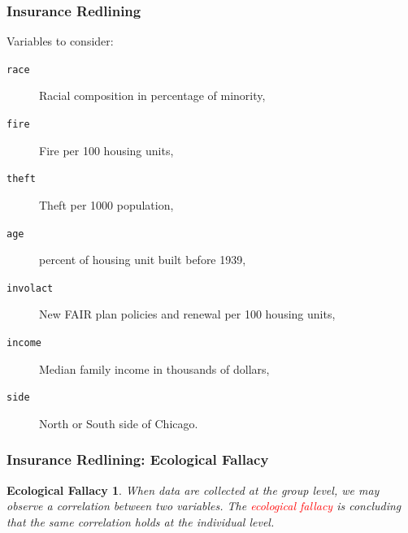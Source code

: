 \newtheorem{DEFsponsorUSCCR}{Sponsor}
\newtheorem{DEFdataFAIR}{Data}

\begin{frame}
    \frametitle{ Insurance Redlining}
    Variables to consider:
    \begin{description}
        \item[\texttt{race}] Racial composition in percentage of minority,
        \item[\texttt{fire}] Fire per 100 housing units,
        \item[\texttt{theft}] Theft per 1000 population,
        \item[\texttt{age}] percent of housing unit built before 1939,
        \item[\texttt{involact}] New FAIR plan policies and renewal per 100 housing units,
        \item[\texttt{income}] Median family income in thousands of dollars,
        \item[\texttt{side}] North or South side of Chicago.
    \end{description}
\end{frame}

\newtheorem{DEFecofallacy}{Ecological Fallacy}
\begin{frame}
    \frametitle{Insurance Redlining: Ecological Fallacy}
    \begin{DEFecofallacy}
       When data are collected at the group level, we may observe 
       a correlation between two variables.  The \textcolor{red}{ecological
       fallacy} is concluding that the same correlation holds at the
       individual level. 
    \end{DEFecofallacy}
\end{frame}

